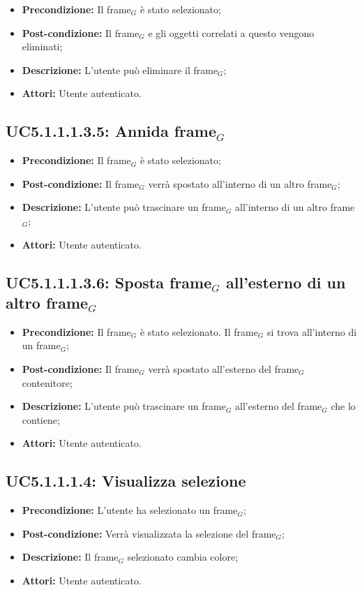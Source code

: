 \begin{itemize}
	\item \textbf{Precondizione:} Il frame$_G$ è stato selezionato;
	\item \textbf{Post-condizione:} Il frame$_G$ e gli oggetti correlati a questo vengono eliminati;
	\item \textbf{Descrizione:} L'utente può eliminare il frame$_G$;
	\item \textbf{Attori:} Utente autenticato.
\end{itemize}
\subsection{ UC5.1.1.1.3.5: Annida frame$_G$}

\begin{itemize}
	\item \textbf{Precondizione:} Il frame$_G$ è stato selezionato;
	\item \textbf{Post-condizione:} Il frame$_G$ verrà spostato all'interno di un altro frame$_G$;
	\item \textbf{Descrizione:} L'utente può trascinare un frame$_G$ all'interno di un altro frame$_G$;
	\item \textbf{Attori:} Utente autenticato.
\end{itemize}
\subsection{ UC5.1.1.1.3.6: Sposta frame$_G$ all'esterno di un altro frame$_G$}

\begin{itemize}
	\item \textbf{Precondizione:} Il frame$_G$ è stato selezionato. Il frame$_G$ si trova all'interno di un frame$_G$;
	\item \textbf{Post-condizione:} Il frame$_G$ verrà spostato all'esterno del frame$_G$ contenitore;
	\item \textbf{Descrizione:} L'utente può trascinare un frame$_G$ all'esterno del frame$_G$ che lo contiene;
	\item \textbf{Attori:} Utente autenticato.
\end{itemize}
\subsection{ UC5.1.1.1.4: Visualizza selezione}

\begin{itemize}
	\item \textbf{Precondizione:} L'utente ha selezionato un frame$_G$;
	\item \textbf{Post-condizione:} Verrà visualizzata la selezione del frame$_G$;
	\item \textbf{Descrizione:} Il frame$_G$ selezionato cambia colore;
	\item \textbf{Attori:} Utente autenticato.
\end{itemize}
\newpage

